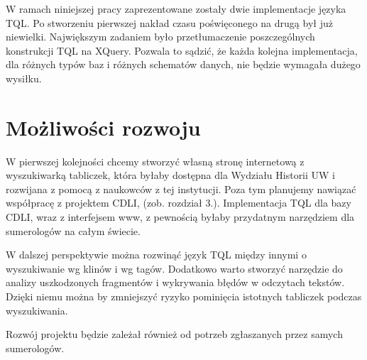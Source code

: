 W ramach niniejszej pracy zaprezentowane zostały dwie implementacje języka TQL. 
Po stworzeniu pierwszej nakład czasu poświęconego na drugą był już niewielki. 
Największym zadaniem było przetłumaczenie poszczególnych konstrukcji TQL na XQuery. 
Pozwala to sądzić, że każda kolejna implementacja, dla różnych typów baz i różnych schematów danych, 
nie będzie wymagała dużego wysiłku. 



\section*{Możliwości rozwoju}
W pierwszej kolejności chcemy stworzyć własną stronę internetową z wyszukiwarką tabliczek, 
która byłaby dostępna dla Wydziału Historii UW i rozwijana z pomocą z naukowców z tej instytucji. 
Poza tym planujemy nawiązać współpracę z projektem CDLI, (zob. rozdział 3.).
Implementacja TQL dla bazy CDLI, wraz z interfejsem www, z pewnością byłaby przydatnym narzędziem dla sumerologów na całym świecie.

W dalszej perspektywie można rozwinąć język TQL między innymi o wyszukiwanie wg klinów i wg tagów. 
Dodatkowo warto stworzyć narzędzie do analizy uszkodzonych fragmentów i wykrywania błędów w odczytach tekstów. 
Dzięki niemu można by zmniejszyć ryzyko pominięcia istotnych tabliczek podczas wyszukiwania. 

Rozwój projektu będzie zależał również od potrzeb zgłaszanych przez samych sumerologów.







%
%
%
